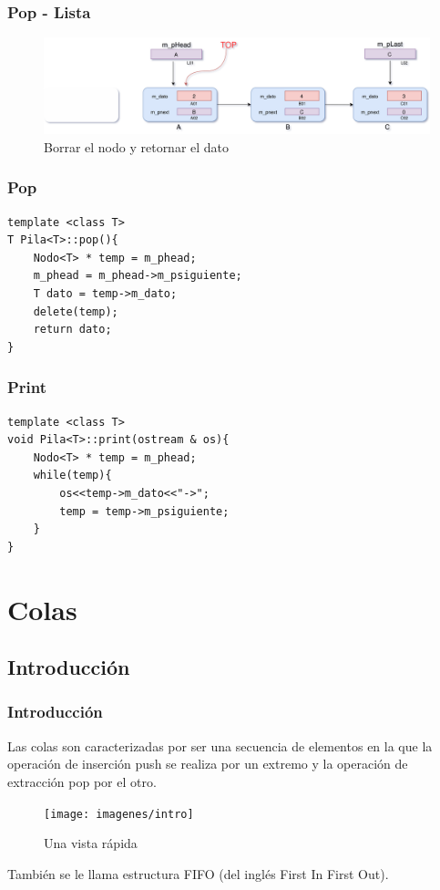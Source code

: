 \documentclass{beamer}
\begin{document}
\begin{frame}
    \frametitle{Pop - Lista}
    
    \begin{figure}
    \includegraphics[width =1 \textwidth]{images/pop03}
    \caption{Borrar el nodo y retornar el dato}
    \end{figure}
       
\end{frame}

\begin{frame}[fragile]
\frametitle{Pop}
\begin{verbatim}
template <class T>
T Pila<T>::pop(){
	Nodo<T> * temp = m_phead;
	m_phead = m_phead->m_psiguiente;
	T dato = temp->m_dato;
	delete(temp);
	return dato;
}

\end{verbatim}
\end{frame}  


\begin{frame}[fragile]
\frametitle{Print}
\begin{verbatim}
template <class T>
void Pila<T>::print(ostream & os){
	Nodo<T> * temp = m_phead;
	while(temp){
		os<<temp->m_dato<<"->";
		temp = temp->m_psiguiente;
	}
}
\end{verbatim}
\end{frame}  



\section {Colas}
\subsection{Introducción}

\begin{frame}
    \frametitle{Introducción}
    Las colas son caracterizadas por ser una secuencia de elementos en la que la operación de inserción push se realiza por un extremo y la operación de extracción pop por el otro.
    \begin{figure}
    \texttt{[image: imagenes/intro]}
    \caption{Una vista rápida}
    \end{figure}
       También se le llama estructura FIFO (del inglés First In First Out).
\end{frame}
\end{document}
